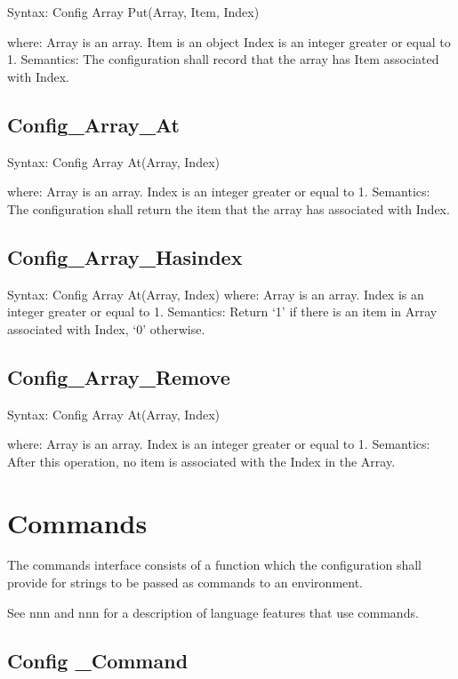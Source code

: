 Syntax: Config Array Put(Array, Item, Index)

where: Array is an array. Item is an object Index is an integer greater
or equal to 1. Semantics: The configuration shall record that the array
has Item associated with Index.

\hypertarget{config_array_at}{%
\subsection{Config\_Array\_At}\label{config_array_at}}

Syntax: Config Array At(Array, Index)

where: Array is an array. Index is an integer greater or equal to 1.
Semantics: The configuration shall return the item that the array has
associated with Index.

\hypertarget{config_array_hasindex}{%
\subsection{Config\_Array\_Hasindex}\label{config_array_hasindex}}

Syntax: Config Array At(Array, Index) where: Array is an array. Index is
an integer greater or equal to 1. Semantics: Return `1' if there is an
item in Array associated with Index, `0' otherwise.

\hypertarget{config_array_remove}{%
\subsection{Config\_Array\_Remove}\label{config_array_remove}}

Syntax: Config Array At(Array, Index)

where: Array is an array. Index is an integer greater or equal to 1.
Semantics: After this operation, no item is associated with the Index in
the Array.

\hypertarget{commands}{%
\section{Commands}\label{commands}}

The commands interface consists of a function which the configuration
shall provide for strings to be passed as commands to an environment.

See nnn and nnn for a description of language features that use
commands.

\hypertarget{config-_command}{%
\subsection{Config \_Command}\label{config-_command}}

